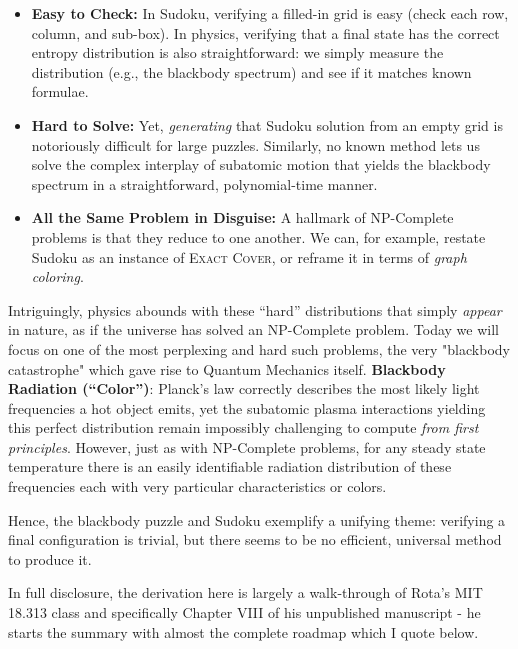 \documentclass{report}
\begin{document}
\begin{itemize}
    \item \textbf{Easy to Check:} In Sudoku, verifying a filled-in grid is easy (check each row, column, and sub-box). In physics, verifying that a final state has the correct entropy distribution is also straightforward: we simply measure the distribution (e.g., the blackbody spectrum) and see if it matches known formulae.
    \item \textbf{Hard to Solve:} Yet, \emph{generating} that Sudoku solution from an empty grid is notoriously difficult for large puzzles. Similarly, no known method lets us solve the complex interplay of subatomic motion that yields the blackbody spectrum in a straightforward, polynomial-time manner.
     \item \textbf{All the Same Problem in Disguise:} A hallmark of NP-Complete problems is that they reduce to one another. We can, for example, restate Sudoku as an instance of \textsc{Exact Cover}, or reframe it in terms of \emph{graph coloring}.
\end{itemize}

Intriguingly, physics abounds with these “hard” distributions that simply \emph{appear} in nature, as if the universe has solved an NP-Complete problem. Today we will focus on one of the most perplexing and hard such problems, the very "blackbody catastrophe" which gave rise to Quantum Mechanics itself.  \textbf{Blackbody Radiation (“Color”)}: Planck’s law correctly describes the most likely light frequencies a hot object emits, yet the subatomic plasma interactions yielding this perfect distribution remain impossibly challenging to compute \emph{from first principles}. However, just as with NP-Complete problems, for any steady state temperature there is an easily identifiable radiation distribution of these frequencies each with very particular characteristics or colors.

Hence, the blackbody puzzle and Sudoku exemplify a unifying theme: verifying a final configuration is trivial, but there seems to be no efficient, universal method to produce it. 


In full disclosure, the derivation here is largely a walk-through of Rota's MIT 18.313 class and specifically  Chapter VIII of his unpublished manuscript - he starts the summary with almost the complete roadmap which I quote below. 
\end{document}
